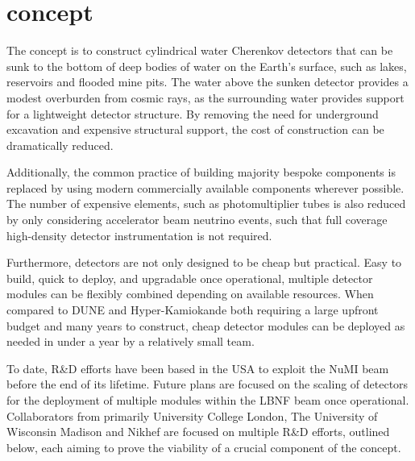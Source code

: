\section{\chips concept} %
\label{sec:chips_concept} %

The \chips concept is to construct cylindrical water Cherenkov detectors that can be sunk to the
bottom of deep bodies of water on the Earth's surface, such as lakes, reservoirs and flooded mine
pits. The water above the sunken detector provides a modest overburden from cosmic rays, as the
surrounding water provides support for a lightweight detector structure. By removing the need for
underground excavation and expensive structural support, the cost of construction can be
dramatically reduced.

Additionally, the common practice of building majority bespoke components is replaced by using
modern commercially available components wherever possible. The number of expensive elements, such
as photomultiplier tubes is also reduced by only considering accelerator beam neutrino events,
such that full coverage high-density detector instrumentation is not required.

Furthermore, \chips detectors are not only designed to be cheap but practical. Easy to build,
quick to deploy, and upgradable once operational, multiple detector modules can be flexibly
combined depending on available resources. When compared to DUNE and Hyper-Kamiokande both
requiring a large upfront budget and many years to construct, cheap \chips detector modules can be
deployed as needed in under a year by a relatively small team.

To date, \chips R\&D efforts have been based in the USA to exploit the NuMI beam before the end of
its lifetime. Future plans are focused on the scaling of \chips detectors for the deployment of
multiple modules within the LBNF beam once operational. Collaborators from primarily University
College London, The University of Wisconsin Madison and Nikhef are focused on multiple R\&D
efforts, outlined below, each aiming to prove the viability of a crucial component of the \chips
concept.

